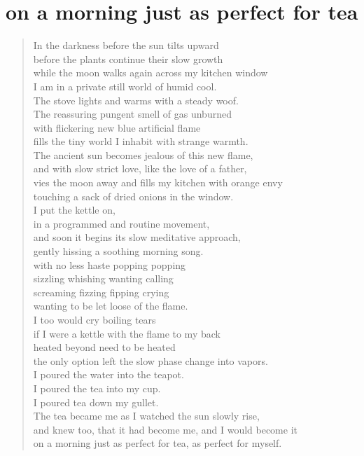 \documentclass[times,12pt]{book}
\begin{document}
\section*{on a morning just as perfect for tea}
\begin{verse}
In the darkness before the sun tilts upward\\
before the plants continue their slow growth\\
while the moon walks again across my kitchen window\\
I am in a private still world of humid cool.\\[12pt]

The stove lights and warms with a steady woof.\\
The reassuring pungent smell of gas unburned\\
with flickering new blue artificial flame\\
 fills the tiny world I inhabit with strange warmth.\\[12pt]

The ancient sun becomes jealous of this new flame,\\
and with slow strict love, like the love of a father,\\
vies the moon away and fills my kitchen with orange envy\\
touching a sack of dried onions in the window.\\[12pt]

I put the kettle on,\\
in a programmed and routine movement,\\
and soon it begins its slow meditative approach,\\
gently hissing a soothing morning song.\\[12pt]

with no less haste popping popping\\
sizzling whishing wanting calling\\
screaming fizzing fipping crying\\
wanting to be let loose of the flame.\\[12pt]

I too would cry boiling tears\\
if I were a kettle with the flame to my back\\
heated beyond need to be heated\\
the only option left the slow phase change into vapors.\\[12pt]

I poured the water into the teapot.\\
I poured the tea into my cup.\\
I poured tea down my gullet.\\[12pt]

The tea became me as I watched the sun slowly rise,\\
and knew too, that it had become me, and I would become it\\
on a morning just as perfect for tea, as perfect for myself.\\
\end{verse}
\newpage
\end{document}
